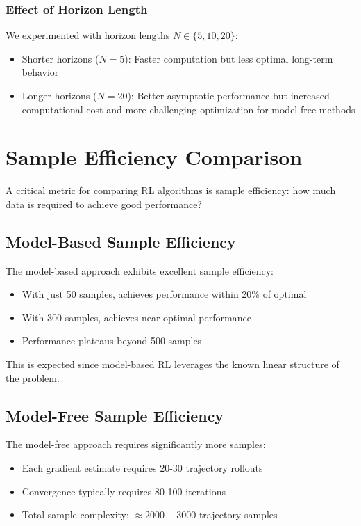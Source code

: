 \documentclass{report}
\begin{document}
\subsubsection{Effect of Horizon Length}

We experimented with horizon lengths $N \in \{5, 10, 20\}$:
\begin{itemize}
    \item Shorter horizons ($N = 5$): Faster computation but less optimal long-term behavior
    \item Longer horizons ($N = 20$): Better asymptotic performance but increased computational cost and more challenging optimization for model-free methods
\end{itemize}

\section{Sample Efficiency Comparison}

A critical metric for comparing RL algorithms is sample efficiency: how much data is required to achieve good performance?

\subsection{Model-Based Sample Efficiency}

The model-based approach exhibits excellent sample efficiency:
\begin{itemize}
    \item With just 50 samples, achieves performance within 20\% of optimal
    \item With 300 samples, achieves near-optimal performance
    \item Performance plateaus beyond 500 samples
\end{itemize}

This is expected since model-based RL leverages the known linear structure of the problem.

\subsection{Model-Free Sample Efficiency}

The model-free approach requires significantly more samples:
\begin{itemize}
    \item Each gradient estimate requires 20-30 trajectory rollouts
    \item Convergence typically requires 80-100 iterations
    \item Total sample complexity: $\approx 2000-3000$ trajectory samples
\end{itemize}
\end{document}
